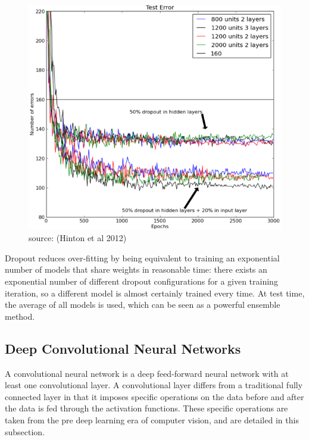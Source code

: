 \documentclass[a4paper,11pt]{article}
\begin{document}
\begin{figure}[h!]
	\centering
	\includegraphics[scale=0.4]{images/dropout.png}
	\caption{source: (Hinton et al 2012)}
\end{figure}

Dropout reduces over-fitting by being equivalent to training an exponential number of models that share weights in reasonable time: there exists an exponential number of different dropout configurations for a given training iteration, so a different model is almost certainly trained every time. At test time, the average of all models is used, which can be seen as a powerful ensemble method. \\

\clearpage

\subsection{Deep Convolutional Neural Networks}

A convolutional neural network is a deep feed-forward neural network with at least one convolutional layer. A convolutional layer differs from a traditional fully connected layer in that it imposes specific operations on the data before and after the data is fed through the activation functions. These specific operations are taken from the pre deep learning era of computer vision, and are detailed in this subsection. \\
\end{document}
